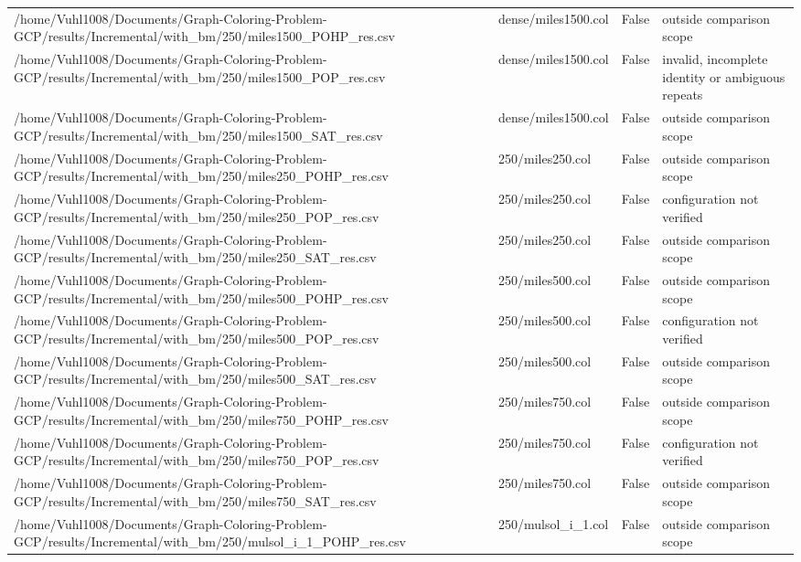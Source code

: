 \begin{table}[htbp]
\begin{tabular}{llll}
/home/Vuhl1008/Documents/Graph-Coloring-Problem-GCP/results/Incremental/with\_bm/250/miles1500\_POHP\_res.csv & dense/miles1500.col & False & outside comparison scope \\
/home/Vuhl1008/Documents/Graph-Coloring-Problem-GCP/results/Incremental/with\_bm/250/miles1500\_POP\_res.csv & dense/miles1500.col & False & invalid, incomplete identity or ambiguous repeats \\
/home/Vuhl1008/Documents/Graph-Coloring-Problem-GCP/results/Incremental/with\_bm/250/miles1500\_SAT\_res.csv & dense/miles1500.col & False & outside comparison scope \\
/home/Vuhl1008/Documents/Graph-Coloring-Problem-GCP/results/Incremental/with\_bm/250/miles250\_POHP\_res.csv & 250/miles250.col & False & outside comparison scope \\
/home/Vuhl1008/Documents/Graph-Coloring-Problem-GCP/results/Incremental/with\_bm/250/miles250\_POP\_res.csv & 250/miles250.col & False & configuration not verified \\
/home/Vuhl1008/Documents/Graph-Coloring-Problem-GCP/results/Incremental/with\_bm/250/miles250\_SAT\_res.csv & 250/miles250.col & False & outside comparison scope \\
/home/Vuhl1008/Documents/Graph-Coloring-Problem-GCP/results/Incremental/with\_bm/250/miles500\_POHP\_res.csv & 250/miles500.col & False & outside comparison scope \\
/home/Vuhl1008/Documents/Graph-Coloring-Problem-GCP/results/Incremental/with\_bm/250/miles500\_POP\_res.csv & 250/miles500.col & False & configuration not verified \\
/home/Vuhl1008/Documents/Graph-Coloring-Problem-GCP/results/Incremental/with\_bm/250/miles500\_SAT\_res.csv & 250/miles500.col & False & outside comparison scope \\
/home/Vuhl1008/Documents/Graph-Coloring-Problem-GCP/results/Incremental/with\_bm/250/miles750\_POHP\_res.csv & 250/miles750.col & False & outside comparison scope \\
/home/Vuhl1008/Documents/Graph-Coloring-Problem-GCP/results/Incremental/with\_bm/250/miles750\_POP\_res.csv & 250/miles750.col & False & configuration not verified \\
/home/Vuhl1008/Documents/Graph-Coloring-Problem-GCP/results/Incremental/with\_bm/250/miles750\_SAT\_res.csv & 250/miles750.col & False & outside comparison scope \\
/home/Vuhl1008/Documents/Graph-Coloring-Problem-GCP/results/Incremental/with\_bm/250/mulsol\_i\_1\_POHP\_res.csv & 250/mulsol\_i\_1.col & False & outside comparison scope \\

\end{tabular}
\end{table}
